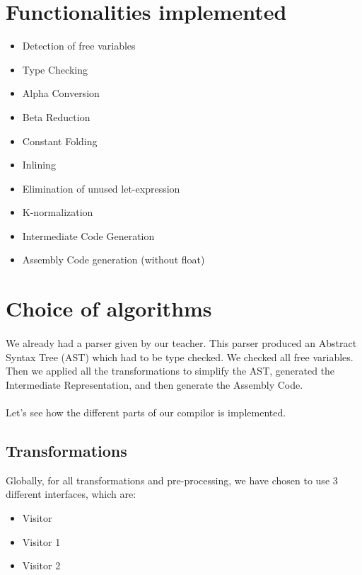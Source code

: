 \documentclass[a4paper,10pt]{article}
\begin{document}
\section{Functionalities implemented}
\begin{itemize}
	\item Detection of free variables
	\item Type Checking
	\item Alpha Conversion
	\item Beta Reduction
	\item Constant Folding
    \item Inlining
    \item Elimination of unused let-expression
    \item K-normalization
	\item Intermediate Code Generation
	\item Assembly Code generation (without float)
\end{itemize}


\section{Choice of algorithms}

\paragraph{}
We already had a parser given by our teacher. This parser produced an Abstract Syntax Tree (AST) which had to be type checked. We checked all free variables.
Then we applied all the transformations to simplify the AST, generated the Intermediate Representation, and then generate the Assembly Code. 

\paragraph{}
Let's see how the different parts of our compilor is implemented.

\subsection{Transformations}

Globally, for all transformations and pre-processing, we have chosen to use 3 different
interfaces, which are:
\begin{itemize}
\item Visitor
\item Visitor 1
\item Visitor 2
\end{itemize}
\end{document}
